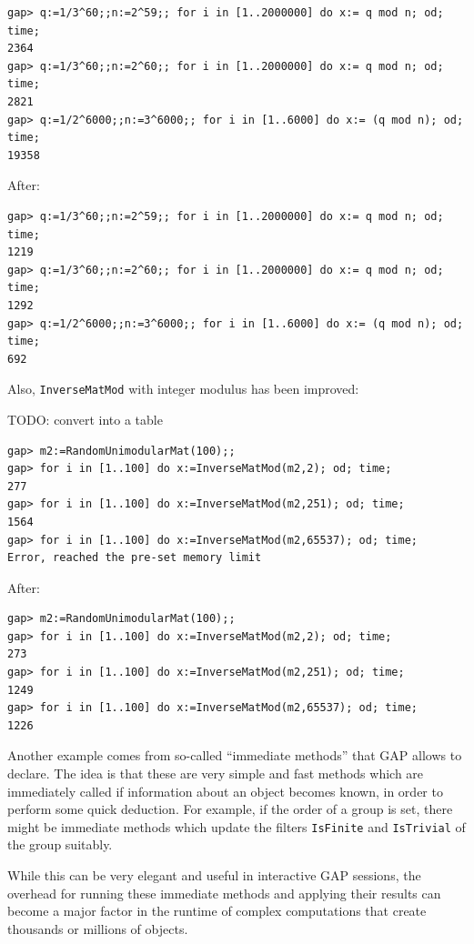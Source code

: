 \documentclass{deliverablereport}
\begin{document}
{\small
\begin{verbatim}
gap> q:=1/3^60;;n:=2^59;; for i in [1..2000000] do x:= q mod n; od; time;
2364
gap> q:=1/3^60;;n:=2^60;; for i in [1..2000000] do x:= q mod n; od; time;
2821
gap> q:=1/2^6000;;n:=3^6000;; for i in [1..6000] do x:= (q mod n); od; time;
19358
\end{verbatim}
}

After:

{\small
\begin{verbatim}
gap> q:=1/3^60;;n:=2^59;; for i in [1..2000000] do x:= q mod n; od; time;
1219
gap> q:=1/3^60;;n:=2^60;; for i in [1..2000000] do x:= q mod n; od; time;
1292
gap> q:=1/2^6000;;n:=3^6000;; for i in [1..6000] do x:= (q mod n); od; time;
692
\end{verbatim}
}

Also, \verb|InverseMatMod| with integer modulus has been improved:%

TODO: convert into a table

{\small
\begin{verbatim}
gap> m2:=RandomUnimodularMat(100);;
gap> for i in [1..100] do x:=InverseMatMod(m2,2); od; time;
277
gap> for i in [1..100] do x:=InverseMatMod(m2,251); od; time;
1564
gap> for i in [1..100] do x:=InverseMatMod(m2,65537); od; time;
Error, reached the pre-set memory limit
\end{verbatim}
}

After:

{\small
\begin{verbatim}
gap> m2:=RandomUnimodularMat(100);;
gap> for i in [1..100] do x:=InverseMatMod(m2,2); od; time;
273
gap> for i in [1..100] do x:=InverseMatMod(m2,251); od; time;
1249
gap> for i in [1..100] do x:=InverseMatMod(m2,65537); od; time;
1226
\end{verbatim}

}

Another example comes from so-called ``immediate methods'' that
GAP allows to  declare. The idea is that these 
are very simple and fast methods which are immediately called if information 
about an object becomes known, in order to perform some quick deduction. 
For example, if the order of a group is set, there might be immediate methods 
which update the filters \verb|IsFinite| and \verb|IsTrivial| of the group suitably.

While this can be very elegant and useful in interactive GAP sessions, 
the overhead for running these immediate methods and applying their 
results can become a major factor in the runtime of complex computations 
that create thousands or millions of objects.
\end{document}
